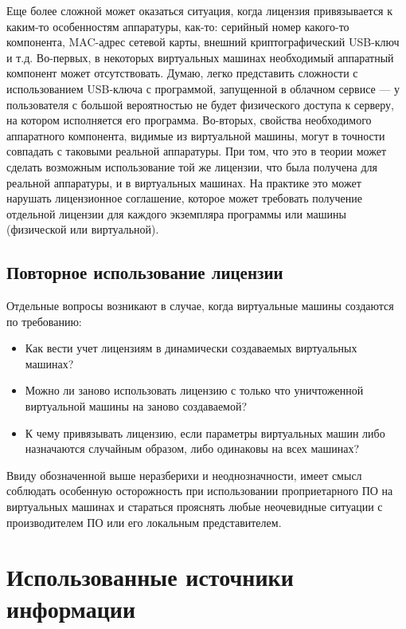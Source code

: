 \documentclass[14pt, a4paper]{article}
\begin{document}
Еще более сложной может оказаться ситуация, когда лицензия привязывается к
каким-то особенностям аппаратуры, как-то: серийный номер какого-то компонента,
MAC-адрес сетевой карты, внешний криптографический USB-ключ и т.д. Во-первых, в
некоторых виртуальных машинах необходимый аппаратный компонент может
отсутствовать. Думаю, легко представить сложности с использованием USB-ключа с
программой, запущенной в облачном сервисе — у пользователя с большой
вероятностью не будет физического доступа к серверу, на котором исполняется его
программа. Во-вторых, свойства необходимого аппаратного компонента, видимые из
виртуальной машины, могут в точности совпадать с таковыми реальной аппаратуры.
При том, что это в теории может сделать возможным использование той же лицензии,
что была получена для реальной аппаратуры, и в виртуальных машинах. На практике
это может нарушать лицензионное соглашение, которое может требовать получение
отдельной лицензии для каждого экземпляра программы или машины (физической или
виртуальной).

\subsection*{Повторное использование лицензии}

Отдельные вопросы возникают в случае, когда виртуальные машины создаются по
требованию:
\begin{itemize}
    \item Как вести учет лицензиям в динамически создаваемых виртуальных машинах?
    \item Можно ли заново использовать лицензию с только что уничтоженной
    виртуальной машины на заново создаваемой?
    \item К чему привязывать лицензию, если параметры виртуальных машин либо
    назначаются случайным образом, либо одинаковы на всех машинах?
\end{itemize}

Ввиду обозначенной выше неразберихи и неоднозначности, имеет смысл соблюдать
особенную осторожность при использовании проприетарного ПО на виртуальных
машинах и стараться прояснять любые неочевидные ситуации с производителем ПО
или его локальным представителем.

\section*{Использованные источники информации}
\end{document}
